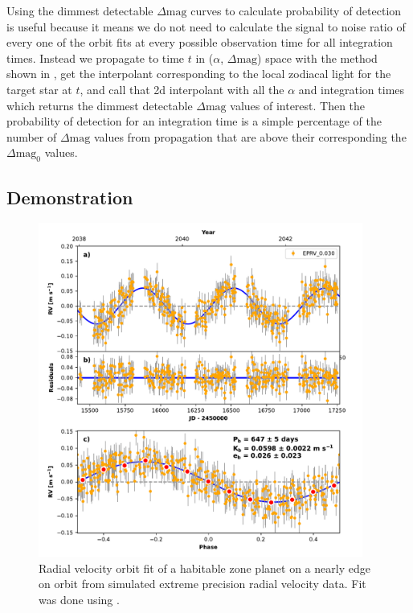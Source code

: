 Using the dimmest detectable $\Delta\textrm{mag}$ curves to calculate
probability of detection is useful because it means we do not need to calculate
the signal to noise ratio of every one of the orbit fits at every possible
observation time for all integration times. Instead we propagate to time $t$ in
($\alpha$, $\Delta\textrm{mag}$) space with the method shown in
, get the interpolant corresponding to the local zodiacal
light for the target star at $t$, and call that 2d interpolant with all the
$\alpha$ and integration times which returns the dimmest detectable
$\Delta\textrm{mag}$ values of interest. Then the probability of detection for
an integration time is a simple percentage of the number of
$\Delta\textrm{mag}$ values from propagation that are above their corresponding
the $\Delta\textrm{mag}_0$ values.

\subsection{Demonstration}

\begin{figure}
  \begin{center}
    \includegraphics[width=0.95\textwidth]{ch3/figures/orbit_plot_mc_HIP_91438.pdf}
  \end{center}
  \caption{Radial velocity orbit fit of a habitable zone planet on a nearly edge on orbit from
  simulated extreme precision radial velocity data. Fit was done using
   \citep{fultonRadvelRadialVelocity2018}.}
  \label{fig:rv_fit}
\end{figure}

